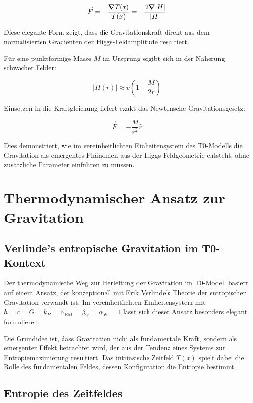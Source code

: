 \documentclass[12pt,a4paper]{article}
\newcommand{\Tfield}{T(x)}
\newcommand{\betaT}{\beta_{\text{T}}}
\newcommand{\alphaEM}{\alpha_{\text{EM}}}
\newcommand{\alphaW}{\alpha_{\text{W}}}
\begin{document}
	\begin{equation}
		\vec{F} = -\frac{\grad \Tfield}{\Tfield} = -\frac{2\grad|H|}{|H|}
	\end{equation}
	
	Diese elegante Form zeigt, dass die Gravitationskraft direkt aus dem normalisierten Gradienten der Higgs-Feldamplitude resultiert.
	
	Für eine punktförmige Masse \(M\) im Ursprung ergibt sich in der Näherung schwacher Felder:
	
	\begin{equation}
		|H(r)| \approx v\left(1 - \frac{M}{2r}\right)
	\end{equation}
	
	Einsetzen in die Kraftgleichung liefert exakt das Newtonsche Gravitationsgesetz:
	
	\begin{equation}
		\vec{F} = -\frac{M}{r^2} \hat{r}
	\end{equation}
	
	Dies demonstriert, wie im vereinheitlichten Einheitensystem des T0-Modells die Gravitation als emergentes Phänomen aus der Higgs-Feldgeometrie entsteht, ohne zusätzliche Parameter einführen zu müssen.
	
	\section{Thermodynamischer Ansatz zur Gravitation}
	
	\subsection{Verlinde's entropische Gravitation im T0-Kontext}
	
	Der thermodynamische Weg zur Herleitung der Gravitation im T0-Modell basiert auf einem Ansatz, der konzeptionell mit Erik Verlinde's Theorie der entropischen Gravitation verwandt ist. Im vereinheitlichten Einheitensystem mit \(\hbar = c = G = k_B = \alphaEM = \betaT = \alphaW = 1\) lässt sich dieser Ansatz besonders elegant formulieren.
	
	Die Grundidee ist, dass Gravitation nicht als fundamentale Kraft, sondern als emergenter Effekt betrachtet wird, der aus der Tendenz eines Systems zur Entropiemaximierung resultiert. Das intrinsische Zeitfeld \(\Tfield\) spielt dabei die Rolle des fundamentalen Feldes, dessen Konfiguration die Entropie bestimmt.
	
	\subsection{Entropie des Zeitfeldes}
	
\end{document}
